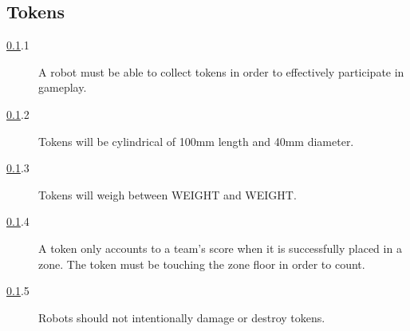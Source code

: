 \subsection {Tokens}
\label{tokens}

\begin {description} 
\item [\ref{tokens}.1] A robot must be able to collect tokens in order to effectively participate in gameplay.
\item [\ref{tokens}.2] Tokens will be cylindrical of 100mm length and 40mm diameter.
\item [\ref{tokens}.3] Tokens will weigh between WEIGHT and WEIGHT.
\item [\ref{tokens}.4] A token only accounts to a team's score when it is successfully placed in a zone. The token must be touching the zone floor in order to count.
\item [\ref{tokens}.5] Robots should not intentionally damage or destroy tokens.
\end {description}

